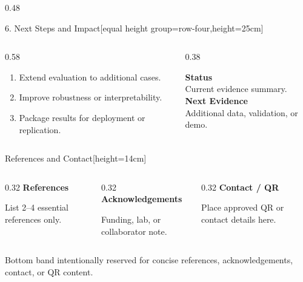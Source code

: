 \documentclass[final]{beamer}
\begin{document}
\begin{frame}[t]
\begin{columns}[t,totalwidth=75.2cm]
\begin{column}{0.48\textwidth}
\begin{posterblock}[PosterOrange]{6. Next Steps and Impact}[equal height group=row-four,height=25cm]
\begin{columns}[T,totalwidth=\linewidth]
\begin{column}{0.58\linewidth}
\begin{enumerate}
  \item Extend evaluation to additional cases.
  \item Improve robustness or interpretability.
  \item Package results for deployment or replication.
\end{enumerate}
\end{column}
\begin{column}{0.38\linewidth}
\begin{tcolorbox}[colback=PosterLight,colframe=PosterOrange,arc=6pt,boxrule=1.2pt]
\centering
\textbf{Status}\\[1mm]
Current evidence summary.\\[2mm]
\textbf{Next Evidence}\\[1mm]
Additional data, validation, or demo.
\end{tcolorbox}
\end{column}
\end{columns}
\end{posterblock}
\end{column}
\end{columns}

\vspace{0.55cm}

\begin{posterblock}[PosterNavy]{References and Contact}[height=14cm]
\small
\begin{columns}[T,totalwidth=\linewidth]
\begin{column}{0.32\linewidth}
\textbf{References}\par
List 2--4 essential references only.
\end{column}
\begin{column}{0.32\linewidth}
\textbf{Acknowledgements}\par
Funding, lab, or collaborator note.
\end{column}
\begin{column}{0.32\linewidth}
\textbf{Contact / QR}\par
Place approved QR or contact details here.
\end{column}
\end{columns}
\end{posterblock}

\vfill
\begin{center}
{\color{PosterGray}\small Bottom band intentionally reserved for concise references, acknowledgements, contact, or QR content.}
\end{center}

\end{frame}
\end{document}
